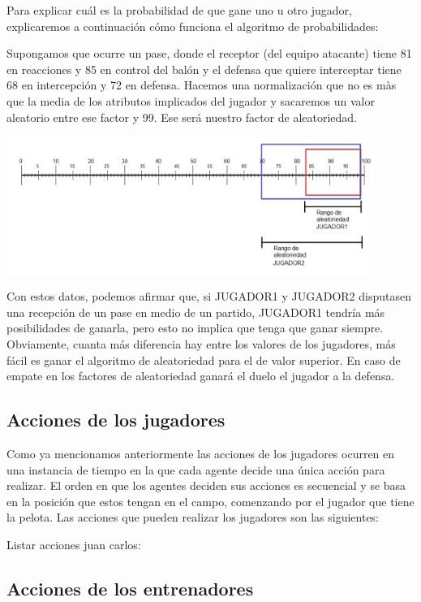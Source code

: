 \documentclass{article}
\begin{document}
Para explicar cuál es la probabilidad de que gane uno u otro jugador,
explicaremos a continuación cómo funciona el algoritmo de probabilidades:

Supongamos que ocurre un pase, donde el receptor (del equipo atacante) tiene 81 en reacciones y 85 en control del 
balón y el defensa que quiere interceptar tiene 68 en intercepción y 72 en defensa. Hacemos una normalización que 
no es màs que la media de los atributos implicados del jugador y sacaremos un valor aleatorio entre ese factor y 99. 
Ese será nuestro factor de aleatoriedad.


\includegraphics*[width=0.9\textwidth]{rank.jpg}
\bigskip

Con estos datos, podemos afirmar que, si JUGADOR1 y JUGADOR2 disputasen una recepción de un pase en medio de un 
partido, JUGADOR1 tendría más posibilidades de ganarla, pero esto no implica que tenga que ganar siempre.
Obviamente, cuanta más diferencia hay entre los valores de los jugadores, más fácil es ganar el algoritmo de 
aleatoriedad para el de valor superior. En caso de empate en los factores de aleatoriedad ganará el duelo el 
jugador a la defensa.

\subsection{Acciones de los jugadores}

Como ya mencionamos anteriormente las acciones de los jugadores ocurren en una instancia de tiempo en la que cada agente decide 
una única acción para realizar. El orden en que los agentes deciden sus acciones es secuencial y se basa en la posición que estos tengan en el campo,
comenzando por el jugador que tiene la pelota. Las acciones que pueden realizar los jugadores son las siguientes:

Listar acciones juan carlos:


\subsection{Acciones de los entrenadores}
\end{document}
